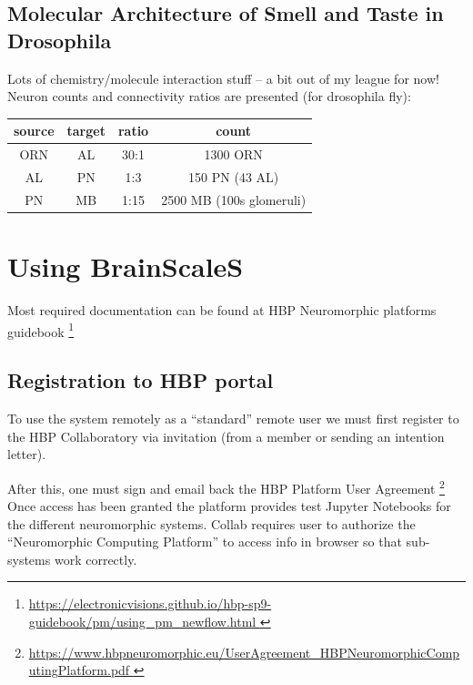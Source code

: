 \documentclass[11pt,a4paper]{article}
\begin{document}
    \subsection{Molecular Architecture of Smell and Taste in Drosophila}
    Lots of chemistry/molecule interaction stuff -- a bit out of my league for now!
    Neuron counts and connectivity ratios are presented (for drosophila fly):
    \begin{table}[h]
      \renewcommand{\arraystretch}{1.3}
      \begin{tabular}{c c c c}
        source & target & ratio & count\\
        \hline
        ORN    & AL     & 30:1 & 1300 ORN\\
        AL     & PN     & 1:3 & 150 PN (43 AL)\\
        PN     & MB     & 1:15 & 2500 MB (100s glomeruli)
      \end{tabular}
    \end{table}


  \section{Using BrainScaleS}
 
  Most required documentation can be found at HBP Neuromorphic platforms guidebook
    \footnote{
    \url{
      https://electronicvisions.github.io/hbp-sp9-guidebook/pm/using_pm_newflow.html
    }
  }
 
  \subsection{Registration to HBP portal}
  To use the system remotely as a ``standard'' remote user we must first register to the HBP Collaboratory via invitation (from a member or sending an intention letter).
 
  After this, one must sign and email back the HBP Platform User  Agreement
  \footnote{
    \url{
      https://www.hbpneuromorphic.eu/UserAgreement_HBPNeuromorphicComputingPlatform.pdf
    }
  }
  Once access has been granted the platform provides test Jupyter Notebooks for the different neuromorphic systems. 
  Collab requires user to authorize the ``Neuromorphic Computing Platform'' to access info in browser so that sub-systems work correctly.
 
\end{document}
